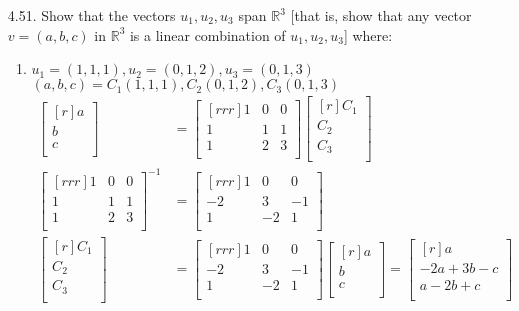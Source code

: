 \documentclass[12pt]{article}
\begin{document}
\begin{enumerate}
\item[4.51.] Show that the vectors $u_1,u_2,u_3$ span $\mathbb{R}^3$ [that is, show that any vector $v=(a,b,c)$ in $\mathbb{R}^3$ is a linear combination of $u_1,u_2,u_3$] where:
	\begin{enumerate}
	\item $u_1=(1,1,1),u_2=(0,1,2),u_3=(0,1,3)$\\
	$(a,b,c)=C_1(1,1,1),C_2(0,1,2),C_3(0,1,3)$\\
	\begin{align*}
	\begin{bmatrix}[r] a\\b\\c\\ \end{bmatrix} &=
	\begin{bmatrix}[rrr] 1&0&0\\1&1&1\\1&2&3\\ \end{bmatrix}
	\begin{bmatrix}[r] C_1\\C_2\\C_3\\ \end{bmatrix}\\
	\begin{bmatrix}[rrr] 1&0&0\\1&1&1\\1&2&3\\ \end{bmatrix}^{-1}
	&= \begin{bmatrix}[rrr] 1&0&0\\-2&3&-1\\1&-2&1\\ \end{bmatrix}\\
	\begin{bmatrix}[r] C_1\\C_2\\C_3\\ \end{bmatrix} &=
	\begin{bmatrix}[rrr] 1&0&0\\-2&3&-1\\1&-2&1\\ \end{bmatrix}
	\begin{bmatrix}[r] a\\b\\c\\ \end{bmatrix} =
	\begin{bmatrix}[r] a\\ -2a+3b-c\\ a-2b+c\\ \end{bmatrix}
	\end{align*}
	

\end{enumerate}
\end{enumerate}
\end{document}
